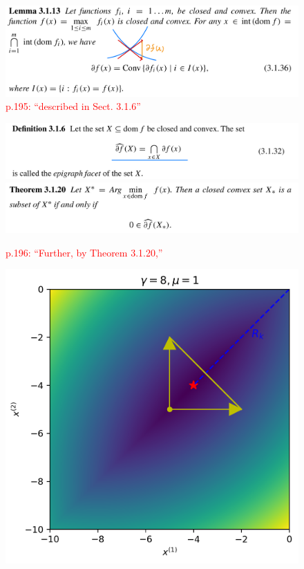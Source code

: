 \documentclass[a4paper, 14pt, dvipdfmx]{extarticle}
\newcommand{\red}[1]{\textcolor{red}{#1}}
\begin{document}
\begin{figure}[H]
    \centering
    \includegraphics[width=\columnwidth]{lem3113.png}
    \caption{\red{p.195: ``described in Sect. 3.1.6''}}
\end{figure}

\begin{figure}[H]
    \centering
    \includegraphics[width=\columnwidth]{def316.png}
    \includegraphics[width=\columnwidth]{thm3120.jpg}
    \caption{\red{p.196: ``Further, by Theorem 3.1.20,''}}
    \label{fig:label}
\end{figure}

\begin{figure}[H]
    \centering
    \includegraphics[width=\columnwidth]{fk3.png}
\end{figure}
\end{document}
